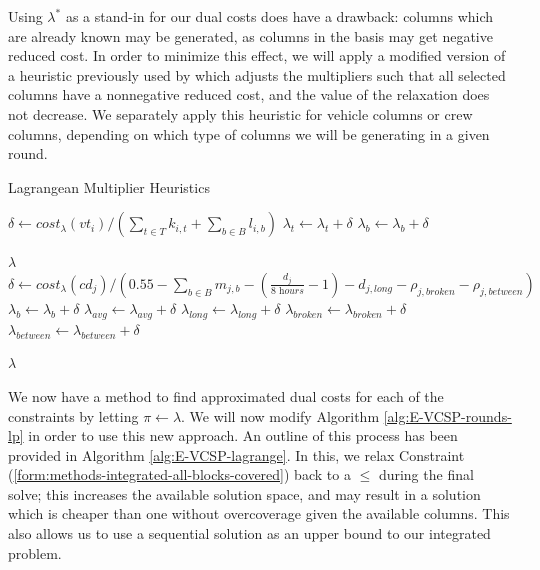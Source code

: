 \documentclass[]{article}
\begin{document}
Using $\lambda^*$ as a stand-in for our dual costs does have a drawback: columns which are already known may be generated, as columns in the basis may get negative reduced cost. In order to minimize this effect, we will apply a modified version of a heuristic previously used by \citet{vanKootenNiekerk2017, Freling1997, Carraresi1995} which adjusts the multipliers such that all selected columns have a nonnegative reduced cost, and the value of the relaxation does not decrease. We separately apply this heuristic for vehicle columns or crew columns, depending on which type of columns we will be generating in a given round.
\begin{algorithm}[h]
\caption{Lagrangean Multiplier Heuristics}\label{alg:lagrange-multiplier-vt}
\begin{algorithmic}
 
  \State $\delta \gets cost_\lambda(vt_i) / (\sum_{t \in T} k_{i,t} + \sum_{b \in B} l_{i,b})$
    \State $\lambda_{t} \gets \lambda_{t} + \delta$
  \EndFor
    \State $\lambda_{b} \gets \lambda_{b} + \delta$
  \EndFor
\EndFor

\Return $\lambda$
\EndProcedure\\
 
    \State $\delta \gets cost_\lambda(cd_j) / (0.55 - \sum_{b \in B} m_{j,b} - (\frac{d_{j}}{\textit{8 hours}} - 1) - d_{j,\textit{long}} - \rho_{j,\textit{broken}} - \rho_{j,\textit{between}})$
      \State $\lambda_{b} \gets \lambda_{b} + \delta$
    \EndFor
    \State $\lambda_{avg} \gets \lambda_{avg} + \delta$
    \State $\lambda_{long} \gets \lambda_{long} + \delta$
    \State $\lambda_{broken} \gets \lambda_{broken} + \delta$
    \State $\lambda_{between} \gets \lambda_{between} + \delta$
  \EndFor

\Return $\lambda$
\EndProcedure
\end{algorithmic} 
\end{algorithm}

We now have a method to find approximated dual costs for each of the constraints by letting $\pi \gets \lambda$. We will now modify Algorithm \ref{alg:E-VCSP-rounds-lp} in order to use this new approach. An outline of this process has been provided in Algorithm \ref{alg:E-VCSP-lagrange}. In this, we relax Constraint (\ref{form:methods-integrated-all-blocks-covered}) back to a $\leq$ during the final solve; this increases the available solution space, and may result in a solution which is cheaper than one without overcoverage given the available columns. This also allows us to use a sequential solution as an upper bound to our integrated problem.
\end{document}
